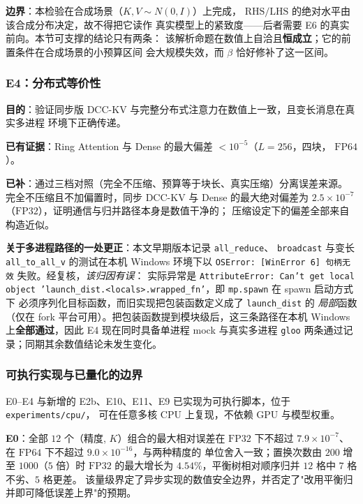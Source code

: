 \textbf{边界}：本检验在合成场景（$K,V\sim N(0,I)$）上完成，
$\mathrm{RHS}/\mathrm{LHS}$ 的绝对水平由该合成分布决定，故不得把它读作
真实模型上的紧致度——后者需要 E6 的真实前向。本节可支撑的结论只有两条：
该解析命题在数值上自洽且\textbf{恒成立}；它的前置条件在合成场景的小预算区间
会大规模失效，而 $\beta$ 恰好修补了这一区间。

\subsubsection{E4：分布式等价性}

\textbf{目的}：验证同步版 DCC-KV 与完整分布式注意力在数值上一致，且变长消息在真实多进程
环境下正确传递。

\textbf{已有证据}：Ring Attention 与 Dense 的最大偏差 $< 10^{-5}$（$L=256$，四块，
$\mathrm{FP64}$）。

\textbf{已补}：通过三档对照（完全不压缩、预算等于块长、真实压缩）分离误差来源。
完全不压缩且不加偏置时，同步 DCC-KV 与 Dense 的最大绝对偏差为
$2.5\times 10^{-7}$（$\mathrm{FP32}$），证明通信与归并路径本身是数值干净的；
压缩设定下的偏差全部来自构造近似。

\textbf{关于多进程路径的一处更正}：本文早期版本记录 \texttt{all\_reduce}、
\texttt{broadcast} 与变长 \texttt{all\_to\_all\_v} 的测试在本机 Windows 环境下以
\texttt{OSError: [WinError 6] 句柄无效} 失败。经复核，\emph{该归因有误}：
实际异常是 \texttt{AttributeError: Can't get local object
'launch\_dist.<locals>.wrapped\_fn'}，即 \texttt{mp.spawn} 在 spawn 启动方式下
必须序列化目标函数，而旧实现把包装函数定义成了 \texttt{launch\_dist} 的
\emph{局部}函数（仅在 fork 平台可用）。把包装函数提到模块级后，这三条路径在本机
Windows 上\textbf{全部通过}，因此 E4 现在同时具备单进程 mock 与真实多进程
\texttt{gloo} 两条通过记录；同期其余数值结论未发生变化。

\subsubsection{可执行实现与已量化的边界}

E0--E4 与新增的 E2b、E10、E11、E9 已实现为可执行脚本，位于
\texttt{experiments/}\allowbreak\texttt{cpu/}，
可在任意多核 CPU 上复现，不依赖 GPU 与模型权重。

\textbf{E0}：全部 $12$ 个（精度, $K$）组合的最大相对误差在 $\mathrm{FP32}$ 下不超过
$7.9\times10^{-7}$、在 $\mathrm{FP64}$ 下不超过 $9.0\times10^{-16}$，与两种精度的
单位舍入一致；置换次数由 $200$ 增至 $1000$（$5$ 倍）时 $\mathrm{FP32}$ 的最大增长为
$4.54\%$，平衡树相对顺序归并 $12$ 格中 $7$ 格不劣、$5$ 格更差。
该量级界定了异步实现的数值安全边界，并否定了"改用平衡归并即可降低误差上界"的预期。

